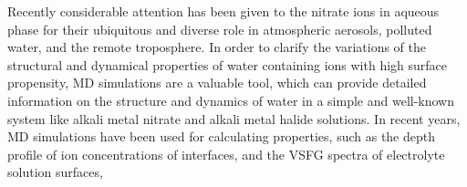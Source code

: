 Recently considerable attention has been given to the nitrate ions in aqueous phase 
for their ubiquitous and diverse role in atmospheric aerosols, polluted water, 
and the remote troposphere. \cite{XuM2009,Jubb2012}
In order to clarify the variations of the structural and dynamical properties 
of water containing ions with high surface propensity, MD simulations are a valuable tool, 
which can provide detailed information on the structure and dynamics  
of water in a simple and well-known system like alkali metal nitrate and alkali metal halide solutions. \cite{KM98}
%
%
In recent years, MD simulations have been used for calculating properties, 
such as the depth profile of ion concentrations of interfaces, \cite{Jungwirth2001,Jungwirth2002}
and the VSFG spectra of electrolyte solution surfaces, \cite{Gopalakrishnan2006,Johnson2014,Ishiyama2014,Ishiyama2017}
